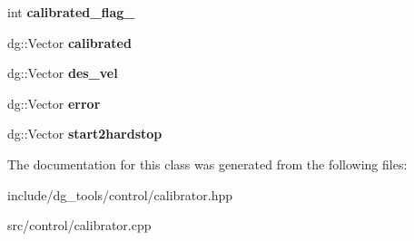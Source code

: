 \begin{DoxyCompactItemize}
\item 
int {\bfseries calibrated\+\_\+flag\+\_\+}\hypertarget{classdynamicgraph_1_1sot_1_1Calibrator_a1f10e5267e7645129c20b8780538f38f}{}\label{classdynamicgraph_1_1sot_1_1Calibrator_a1f10e5267e7645129c20b8780538f38f}

\item 
dg\+::\+Vector {\bfseries calibrated}\hypertarget{classdynamicgraph_1_1sot_1_1Calibrator_ab7506d42715a3e7637841bf5e046014c}{}\label{classdynamicgraph_1_1sot_1_1Calibrator_ab7506d42715a3e7637841bf5e046014c}

\item 
dg\+::\+Vector {\bfseries des\+\_\+vel}\hypertarget{classdynamicgraph_1_1sot_1_1Calibrator_a539f55a526af079bbff20aa54b2a77d9}{}\label{classdynamicgraph_1_1sot_1_1Calibrator_a539f55a526af079bbff20aa54b2a77d9}

\item 
dg\+::\+Vector {\bfseries error}\hypertarget{classdynamicgraph_1_1sot_1_1Calibrator_a2eb24a4bf06dd9cec37262c923e58d7e}{}\label{classdynamicgraph_1_1sot_1_1Calibrator_a2eb24a4bf06dd9cec37262c923e58d7e}

\item 
dg\+::\+Vector {\bfseries start2hardstop}\hypertarget{classdynamicgraph_1_1sot_1_1Calibrator_a5d2ba5611afbe6990ecde291411e73dd}{}\label{classdynamicgraph_1_1sot_1_1Calibrator_a5d2ba5611afbe6990ecde291411e73dd}

\end{DoxyCompactItemize}


The documentation for this class was generated from the following files\+:\begin{DoxyCompactItemize}
\item 
include/dg\+\_\+tools/control/calibrator.\+hpp\item 
src/control/calibrator.\+cpp\end{DoxyCompactItemize}
